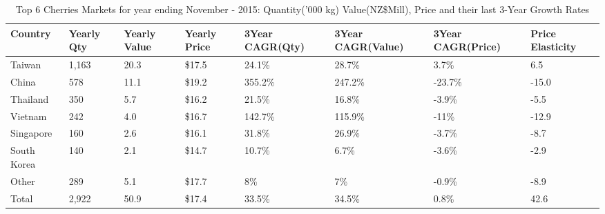 \begin{table}[ht]
\centering
{\scriptsize
\begin{tabular}[t]{p{1.8cm}>{\hfill}p{1.4cm}>{\hfill}p{1.4cm}>{\hfill}p{1.6cm}>{\hfill}p{1.9cm}>{\hfill}p{2cm}>{\hfill}p{1.9cm}>{\hfill}p{1.5cm}}
 \textbf{Country} & \textbf{Yearly Qty} & \textbf{Yearly Value} & \textbf{Yearly Price} & \textbf{3Year CAGR(Qty)} & \textbf{3Year CAGR(Value)} & \textbf{3Year CAGR(Price)} & \textbf{Price Elasticity} \\
\hline
Taiwan & 1,163 & 20.3 & \$17.5 & 24.1\% & 28.7\% & 3.7\% & 6.5 \\  
China & 578 & 11.1 & \$19.2 & 355.2\% & 247.2\% & -23.7\% & -15.0 \\  
Thailand & 350 & 5.7 & \$16.2 & 21.5\% & 16.8\% & -3.9\% & -5.5 \\  
Vietnam & 242 & 4.0 & \$16.7 & 142.7\% & 115.9\% & -11\% & -12.9 \\  
Singapore & 160 & 2.6 & \$16.1 & 31.8\% & 26.9\% & -3.7\% & -8.7 \\  
South Korea & 140 & 2.1 & \$14.7 & 10.7\% & 6.7\% & -3.6\% & -2.9 \\  
Other & 289 & 5.1 & \$17.7 & 8\% & 7\% & -0.9\% & -8.9 \\  
Total & 2,922 & 50.9 & \$17.4 & 33.5\% & 34.5\% & 0.8\% & 42.6 \\  
\hline
\end{tabular}
}
\caption{\scriptsize Top 6 Cherries Markets for year ending November - 2015: Quantity('000 kg) Value(NZ\$Mill), Price and their last 3-Year Growth Rates}
\end{table}


